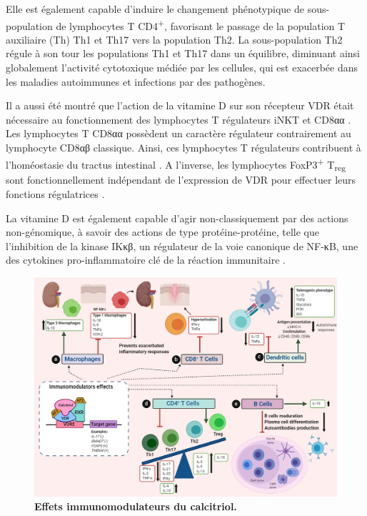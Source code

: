 \documentclass[
  a4paper,
  DIV=11,
  numbers=noendperiod,
  listof=totoc]{scrreprt}
\begin{document}
Elle est également capable d'induire le changement phénotypique de
sous-population de lymphocytes T CD4\textsuperscript{+}, favorisant le
passage de la population T auxiliaire (Th) Th1 et Th17 vers la
population Th2. La sous-population Th2 régule à son tour les populations
Th1 et Th17 dans un équilibre, diminuant ainsi globalement l'activité
cytotoxique médiée par les cellules, qui est exacerbée dans les maladies
autoimmunes et infections par des
pathogènes\autocite{Holick.2011,Meza-Meza.2020}.

Il a aussi été montré que l'action de la vitamine D sur son récepteur
VDR était nécessaire au fonctionnement des lymphocytes T régulateurs
iNKT et CD8αα \autocite{Cheroutre.2008}. Les lymphocytes T CD8αα
possèdent un caractère régulateur contrairement au lymphocyte CD8αβ
classique. Ainsi, ces lymphocytes T régulateurs contribuent à
l'homéostasie du tractus intestinal \autocite{Cantorna.2010}. A
l'inverse, les lymphocytes FoxP3\textsuperscript{+} T\textsubscript{reg}
sont fonctionnellement indépendant de l'expression de VDR pour effectuer
leurs fonctions régulatrices \autocite{Cantorna.2010}.

La vitamine D est également capable d'agir non-classiquement par des
actions non-génomique, à savoir des actions de type protéine-protéine,
telle que l'inhibition de la kinase IKκβ, un régulateur de la voie
canonique de NF-κB, une des cytokines pro-inflammatoire clé de la
réaction immunitaire \autocite{Hii.2016}.

\begin{figure}
\includegraphics{figures/calcitriol-immunomodulatory.jpg} 
\caption[\textbf{Effets immunomodulateurs du calcitriol.}]
{\textbf{Effets immunomodulateurs du calcitriol.} \cite{Meza-Meza.2020}}
\label{fig:immunomod}
\end{figure}
\end{document}
